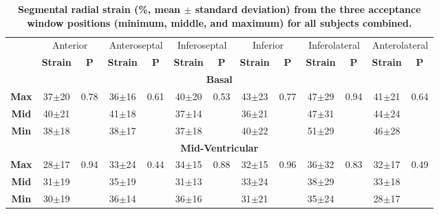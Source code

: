 \begin{appendices}
	\begin{table}
		\centering
		\caption[Segmental radial strain (\%, mean $\pm$ standard deviation) from the three acceptance window positions (minimum, middle, and maximum) for all subjects combined]{\textbf{Segmental radial strain (\%, mean $\pm$ standard deviation) from the three acceptance window positions (minimum, middle, and maximum) for all subjects combined.}}
		\label{table:SegmentialErrStrainDiff}
		\begin{tabular}{ccccccccccccc}
			\toprule
			\multirow{2}{*}{} & \multicolumn{2}{c}{Anterior} & \multicolumn{2}{c}{Anteroseptal} & \multicolumn{2}{c}{Inferoseptal} &
			\multicolumn{2}{c}{Inferior} & \multicolumn{2}{c}{Inferolateral} & \multicolumn{2}{c}{Anterolateral}\\
			& \textbf{Strain} & \textbf{P} & \textbf{Strain} & \textbf{P} & \textbf{Strain} & \textbf{P} &
			\textbf{Strain} & \textbf{P} & \textbf{Strain} & \textbf{P} & \textbf{Strain} & \textbf{P} \\
			\midrule
			
			\multicolumn{13}{c}{\textbf{Basal}} \\
			\midrule
			\textbf{Max} & 37$\pm$20 & \multirow{3}{*}{0.78} & 36$\pm$16 & \multirow{3}{*}{0.61} & 40$\pm$20 & \multirow{3}{*}{0.53}
					     & 43$\pm$23 & \multirow{3}{*}{0.77} & 47$\pm$29 & \multirow{3}{*}{0.94} & 41$\pm$21 & \multirow{3}{*}{0.64} \\
			\textbf{Mid} & 40$\pm$21 &                       & 41$\pm$18 &                       & 37$\pm$14 & 
					     & 36$\pm$21 &                       & 47$\pm$31 &                       & 44$\pm$24 &                       \\
			\textbf{Min} & 38$\pm$18 &                       & 38$\pm$17 &                       & 37$\pm$18 & 
						 & 40$\pm$22 &                       & 51$\pm$29 &                       & 46$\pm$28 &  \\ 
			\midrule
			
			\multicolumn{13}{c}{\textbf{Mid-Ventricular}} \\
			\midrule
			\textbf{Max} & 28$\pm$17 & \multirow{3}{*}{0.94} & 33$\pm$24 & \multirow{3}{*}{0.44} & 34$\pm$15 & \multirow{3}{*}{0.88}
						 & 32$\pm$15 & \multirow{3}{*}{0.96} & 36$\pm$32 & \multirow{3}{*}{0.83} & 32$\pm$17 & \multirow{3}{*}{0.49} \\
			\textbf{Mid} & 31$\pm$19 &                       & 35$\pm$19 &                       & 31$\pm$13 & 
					     & 33$\pm$24 &                       & 38$\pm$29 &                       & 33$\pm$18 &                       \\
			\textbf{Min} & 30$\pm$19 &                       & 36$\pm$14 &                       & 36$\pm$16 & 
						 & 31$\pm$21 &                       & 35$\pm$24 &                       & 28$\pm$17 &  \\ 
			\midrule
			

\end{tabular}
\end{table}
\end{appendices}

